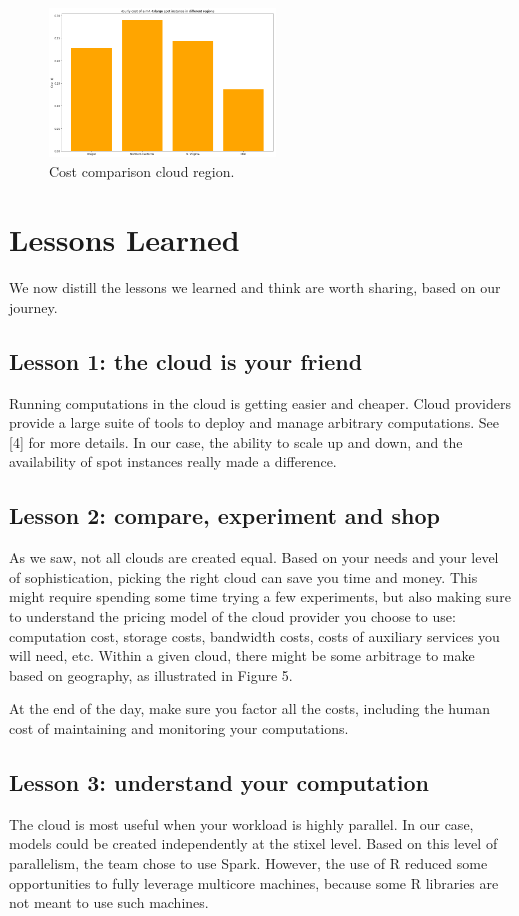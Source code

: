 \documentclass{acm_proc_article-sp}
\begin{document}
\begin{figure}[h]
    \centering
    \includegraphics[width=6cm]{IMG/cost-comp-2.png}
    \caption{Cost comparison cloud region.}
    \label{fig::cost-comp-2}
\end{figure}

\section{Lessons Learned}\label{sec::lessons}
We now distill the lessons we learned and think are worth sharing, based on our journey.

\subsection*{Lesson 1: the cloud is your friend}
Running computations in the cloud is getting easier and cheaper. Cloud providers provide a large suite of tools to deploy and manage arbitrary computations. See [4] for more details. In our case, the ability to scale up and down, and the availability of spot instances really made a difference.
 
\subsection*{Lesson 2: compare, experiment and shop}
As we saw, not all clouds are created equal. Based on your needs and your level of sophistication, picking the right cloud can save you time and money. This might require spending some time trying a few experiments, but also making sure to understand  the pricing model of the cloud provider you choose to use: computation cost, storage costs, bandwidth costs, costs of auxiliary services you will need, etc. Within a given cloud, there might be some arbitrage to make based on geography, as illustrated in Figure 5.

At the end of the day, make sure you factor all the costs, including the human cost of maintaining and monitoring your computations.

\subsection*{Lesson 3: understand your computation}
The cloud is most useful when your workload is highly parallel. In our case, models could be created independently at the stixel level. Based on this level of parallelism, the team chose to use Spark. However, the use of R reduced some opportunities to fully leverage multicore machines, because some R libraries are not meant to use such machines.
\end{document}
